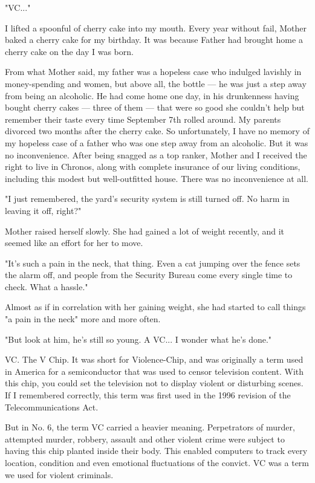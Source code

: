 "VC..."

I lifted a spoonful of cherry cake into my mouth. Every year without
fail, Mother baked a cherry cake for my birthday. It was because Father
had brought home a cherry cake on the day I was born.

From what Mother said, my father was a hopeless case who indulged
lavishly in money-spending and women, but above all, the bottle --- he was
just a step away from being an alcoholic. He had come home one day, in
his drunkenness having bought cherry cakes --- three of them --- that were
so good she couldn't help but remember their taste every time September
7th rolled around. My parents divorced two months after the cherry cake.
So unfortunately, I have no memory of my hopeless case of a father who
was one step away from an alcoholic. But it was no inconvenience. After
being snagged as a top ranker, Mother and I received the right to live
in Chronos, along with complete insurance of our living conditions,
including this modest but well-outfitted house. There was no
inconvenience at all.

"I just remembered, the yard's security system is still turned off. No
harm in leaving it off, right?"

Mother raised herself slowly. She had gained a lot of weight recently,
and it seemed like an effort for her to move.

"It's such a pain in the neck, that thing. Even a cat jumping over the
fence sets the alarm off, and people from the Security Bureau come every
single time to check. What a hassle."

Almost as if in correlation with her gaining weight, she had started to
call things "a pain in the neck" more and more often.

"But look at him, he's still so young. A VC... I wonder what he's done."

VC. The V Chip. It was short for Violence-Chip, and was originally a
term used in America for a semiconductor that was used to censor
television content. With this chip, you could set the television not to
display violent or disturbing scenes. If I remembered correctly, this
term was first used in the 1996 revision of the Telecommunications Act.

But in No. 6, the term VC carried a heavier meaning. Perpetrators of
murder, attempted murder, robbery, assault and other violent crime were
subject to having this chip planted inside their body. This enabled
computers to track every location, condition and even emotional
fluctuations of the convict. VC was a term we used for violent
criminals.


